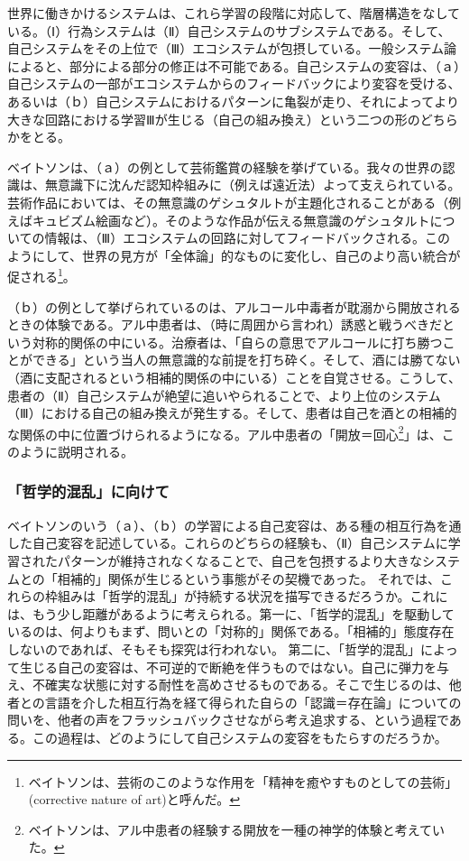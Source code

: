 \documentclass[b5j,twoside,twocolumn]{utarticle}
\begin{document}
世界に働きかけるシステムは、これら学習の段階に対応して、階層構造をなしている。（Ⅰ）行為システムは（Ⅱ）自己システムのサブシステムである。そして、自己システムをその上位で（Ⅲ）エコシステムが包摂している。一般システム論によると、部分による部分の修正は不可能である。自己システムの変容は、（ａ）自己システムの一部がエコシステムからのフィードバックにより変容を受ける、あるいは（ｂ）自己システムにおけるパターンに亀裂が走り、それによってより大きな回路における学習Ⅲが生じる（自己の組み換え）という二つの形のどちらかをとる。


ベイトソンは、（ａ）の例として芸術鑑賞の経験を挙げている。我々の世界の認識は、無意識下に沈んだ認知枠組みに（例えば遠近法）よって支えられている。芸術作品においては、その無意識のゲシュタルトが主題化されることがある（例えばキュビズム絵画など）。そのような作品が伝える無意識のゲシュタルトについての情報は、（Ⅲ）エコシステムの回路に対してフィードバックされる。このようにして、世界の見方が「全体論」的なものに変化し、自己のより高い統合が促される\footnote{ベイトソンは、芸術のこのような作用を「精神を癒やすものとしての芸術」(corrective nature of art)と呼んだ。}。


（ｂ）の例として挙げられているのは、アルコール中毒者が耽溺から開放されるときの体験である。アル中患者は、（時に周囲から言われ）誘惑と戦うべきだという対称的関係の中にいる。治療者は、「自らの意思でアルコールに打ち勝つことができる」という当人の無意識的な前提を打ち砕く。そして、酒には勝てない（酒に支配されるという相補的関係の中にいる）ことを自覚させる。こうして、患者の（Ⅱ）自己システムが絶望に追いやられることで、より上位のシステム（Ⅲ）における自己の組み換えが発生する。そして、患者は自己を酒との相補的な関係の中に位置づけられるようになる。アル中患者の「開放＝回心\footnote{ベイトソンは、アル中患者の経験する開放を一種の神学的体験と考えていた。}」は、このように説明される。


\subsubsection*{「哲学的混乱」に向けて}
ベイトソンのいう（ａ）、（ｂ）の学習による自己変容は、ある種の相互行為を通した自己変容を記述している。これらのどちらの経験も、（Ⅱ）自己システムに学習されたパターンが維持されなくなることで、自己を包摂するより大きなシステムとの「相補的」関係が生じるという事態がその契機であった。
それでは、これらの枠組みは「哲学的混乱」が持続する状況を描写できるだろうか。これには、もう少し距離があるように考えられる。第一に、「哲学的混乱」を駆動しているのは、何よりもまず、問いとの「対称的」関係である。「相補的」態度存在しないのであれば、そもそも探究は行われない。
第二に、「哲学的混乱」によって生じる自己の変容は、不可逆的で断絶を伴うものではない。自己に弾力を与え、不確実な状態に対する耐性を高めさせるものである。そこで生じるのは、他者との言語を介した相互行為を経て得られた自らの「認識＝存在論」についての問いを、他者の声をフラッシュバックさせながら考え追求する、という過程である。この過程は、どのようにして自己システムの変容をもたらすのだろうか。
\end{document}
